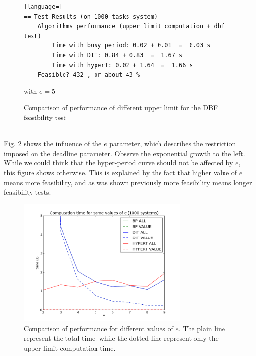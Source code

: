 \documentclass[a4paper,10pt]{article}
\begin{document}
\begin{figure}[h]
\begin{center}

\begin{lstlisting}[language=]
== Test Results (on 1000 tasks system)
	Algorithms performance (upper limit computation + dbf test)
		Time with busy period: 0.02 + 0.01  =  0.03 s
		Time with DIT: 0.84 + 0.83  =  1.67 s
		Time with hyperT: 0.02 + 1.64  =  1.66 s
	Feasible? 432 , or about 43 %
\end{lstlisting}

\caption{Comparison of performance of different upper limit for the DBF feasibility test} with $e=5$
\label{fig:simuTextResult}
\end{center}
\end{figure}

~\\

Fig. \ref{fig:simuGraphE} shows the influence of the $e$ parameter, which describes the restriction imposed on the deadline parameter. Observe the exponential growth to the left. While we could think that the hyper-period curve should not be affected by $e$, this figure shows otherwise. This is explained by the fact that higher value of $e$ means more feasibility, and as was shown previously more feasibility means longer feasibility tests.

\begin{figure}[h]
\begin{center}

\includegraphics[width=0.75\textwidth]{figs/001_137389818886_princess.png}

\caption{Comparison of performance for different values of $e$. The plain line represent the total time, while the dotted line represent only the upper limit computation time.}
\label{fig:simuGraphE}
\end{center}
\end{figure}
\end{document}
